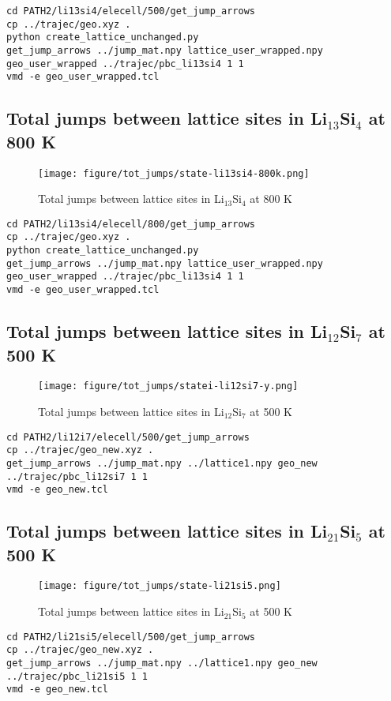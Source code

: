 \documentclass{article}
\begin{document}
\begin{verbatim}
cd PATH2/li13si4/elecell/500/get_jump_arrows
cp ../trajec/geo.xyz .
python create_lattice_unchanged.py
get_jump_arrows ../jump_mat.npy lattice_user_wrapped.npy geo_user_wrapped ../trajec/pbc_li13si4 1 1
vmd -e geo_user_wrapped.tcl
\end{verbatim}


\FloatBarrier
\subsection{Total jumps between lattice sites in Li$_13$Si$_4$ at 800 K}
\begin{figure}[h!]
\centering
\texttt{[image: figure/tot\_jumps/state-li13si4-800k.png]}
\caption{Total jumps between lattice sites in Li$_13$Si$_4$ at 800 K} 
\end{figure}
\begin{verbatim}
cd PATH2/li13si4/elecell/800/get_jump_arrows
cp ../trajec/geo.xyz .
python create_lattice_unchanged.py
get_jump_arrows ../jump_mat.npy lattice_user_wrapped.npy geo_user_wrapped ../trajec/pbc_li13si4 1 1
vmd -e geo_user_wrapped.tcl
\end{verbatim}

\FloatBarrier
\subsection{Total jumps between lattice sites in Li$_12$Si$_7$ at 500 K}
\begin{figure}[h!]
\centering
\texttt{[image: figure/tot\_jumps/statei-li12si7-y.png]}
\caption{Total jumps between lattice sites in Li$_12$Si$_7$ at 500 K} 
\end{figure}

\begin{verbatim}
cd PATH2/li12i7/elecell/500/get_jump_arrows
cp ../trajec/geo_new.xyz .
get_jump_arrows ../jump_mat.npy ../lattice1.npy geo_new ../trajec/pbc_li12si7 1 1
vmd -e geo_new.tcl
\end{verbatim}




\FloatBarrier
\subsection{Total jumps between lattice sites in Li$_21$Si$_5$ at 500 K}

\begin{figure}[h!]
\centering
\texttt{[image: figure/tot\_jumps/state-li21si5.png]}
\caption{Total jumps between lattice sites in Li$_21$Si$_5$ at 500 K} 
\end{figure}
\begin{verbatim}
cd PATH2/li21si5/elecell/500/get_jump_arrows
cp ../trajec/geo_new.xyz .
get_jump_arrows ../jump_mat.npy ../lattice1.npy geo_new ../trajec/pbc_li21si5 1 1
vmd -e geo_new.tcl
\end{verbatim}
\end{document}

